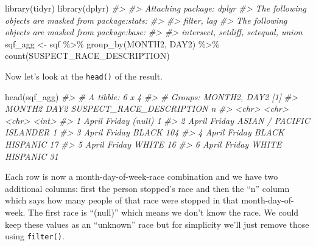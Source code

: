 \documentclass[
]{krantz}
\makeatletter
\newenvironment{Shaded}{\begin{snugshade}}{\end{snugshade}}
\newcommand{\CommentTok}[1]{\textcolor[rgb]{0.37,0.37,0.37}{\textit{#1}}}
\newcommand{\FunctionTok}[1]{\textcolor[rgb]{0,0,0}{#1}}
\newcommand{\NormalTok}[1]{#1}
\newcommand{\OtherTok}[1]{\textcolor[rgb]{0.37,0.37,0.37}{#1}}
\newcommand{\SpecialCharTok}[1]{\textcolor[rgb]{0,0,0}{#1}}
\newenvironment{kframe}{%
\medskip{}
\setlength{\fboxsep}{.8em}
 \def\at@end@of@kframe{}%
 \ifinner\ifhmode%
  \def\at@end@of@kframe{\end{minipage}}%
  \begin{minipage}{\columnwidth}%
 \fi\fi%
 \def\FrameCommand##1{\hskip\@totalleftmargin \hskip-\fboxsep
 \colorbox{shadecolor}{##1}\hskip-\fboxsep
     \hskip-\linewidth \hskip-\@totalleftmargin \hskip\columnwidth}%
 \MakeFramed {\advance\hsize-\width
   \@totalleftmargin\z@ \linewidth\hsize
   \@setminipage}}%
 {\par\unskip\endMakeFramed%
 \at@end@of@kframe}
\renewenvironment{Shaded}{\begin{kframe}}{\end{kframe}}
\makeatother
\begin{document}
\begin{Shaded}
\begin{Highlighting}[]
\FunctionTok{library}\NormalTok{(tidyr)}
\FunctionTok{library}\NormalTok{(dplyr)}
\CommentTok{\#\textgreater{} }
\CommentTok{\#\textgreater{} Attaching package: \textquotesingle{}dplyr\textquotesingle{}}
\CommentTok{\#\textgreater{} The following objects are masked from \textquotesingle{}package:stats\textquotesingle{}:}
\CommentTok{\#\textgreater{} }
\CommentTok{\#\textgreater{}     filter, lag}
\CommentTok{\#\textgreater{} The following objects are masked from \textquotesingle{}package:base\textquotesingle{}:}
\CommentTok{\#\textgreater{} }
\CommentTok{\#\textgreater{}     intersect, setdiff, setequal, union}
\NormalTok{sqf\_agg }\OtherTok{\textless{}{-}}\NormalTok{ sqf }\SpecialCharTok{\%\textgreater{}\%} 
  \FunctionTok{group\_by}\NormalTok{(MONTH2,}
\NormalTok{           DAY2) }\SpecialCharTok{\%\textgreater{}\%}
  \FunctionTok{count}\NormalTok{(SUSPECT\_RACE\_DESCRIPTION)}
\end{Highlighting}
\end{Shaded}

Now let's look at the \texttt{head()} of the result.

\begin{Shaded}
\begin{Highlighting}[]
\FunctionTok{head}\NormalTok{(sqf\_agg)}
\CommentTok{\#\textgreater{} \# A tibble: 6 x 4}
\CommentTok{\#\textgreater{} \# Groups:   MONTH2, DAY2 [1]}
\CommentTok{\#\textgreater{}   MONTH2 DAY2   SUSPECT\_RACE\_DESCRIPTION     n}
\CommentTok{\#\textgreater{}   \textless{}chr\textgreater{}  \textless{}chr\textgreater{}  \textless{}chr\textgreater{}                    \textless{}int\textgreater{}}
\CommentTok{\#\textgreater{} 1 April  Friday (null)                       1}
\CommentTok{\#\textgreater{} 2 April  Friday ASIAN / PACIFIC ISLANDER     1}
\CommentTok{\#\textgreater{} 3 April  Friday BLACK                      104}
\CommentTok{\#\textgreater{} 4 April  Friday BLACK HISPANIC              17}
\CommentTok{\#\textgreater{} 5 April  Friday WHITE                       16}
\CommentTok{\#\textgreater{} 6 April  Friday WHITE HISPANIC              31}
\end{Highlighting}
\end{Shaded}

Each row is now a month-day-of-week-race combination and we have two additional columns: first the person stopped's race and then the ``n'' column which says how many people of that race were stopped in that month-day-of-week. The first race is ``(null)'' which means we don't know the race. We could keep these values as an ``unknown'' race but for simplicity we'll just remove those using \texttt{filter()}.
\end{document}

